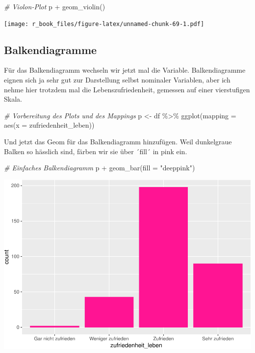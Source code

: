 \documentclass[
]{book}
\newenvironment{Shaded}{\begin{snugshade}}{\end{snugshade}}
\newcommand{\AttributeTok}[1]{\textcolor[rgb]{0.77,0.63,0.00}{#1}}
\newcommand{\CommentTok}[1]{\textcolor[rgb]{0.56,0.35,0.01}{\textit{#1}}}
\newcommand{\FunctionTok}[1]{\textcolor[rgb]{0.00,0.00,0.00}{#1}}
\newcommand{\NormalTok}[1]{#1}
\newcommand{\OtherTok}[1]{\textcolor[rgb]{0.56,0.35,0.01}{#1}}
\newcommand{\SpecialCharTok}[1]{\textcolor[rgb]{0.00,0.00,0.00}{#1}}
\newcommand{\StringTok}[1]{\textcolor[rgb]{0.31,0.60,0.02}{#1}}
\begin{document}
\begin{Shaded}
\begin{Highlighting}[]
\CommentTok{\# Violon{-}Plot}
\NormalTok{p }\SpecialCharTok{+} \FunctionTok{geom\_violin}\NormalTok{()}
\end{Highlighting}
\end{Shaded}

\texttt{[image: r\_book\_files/figure-latex/unnamed-chunk-69-1.pdf]}

\hypertarget{balkendiagramme}{%
\subsection{Balkendiagramme}\label{balkendiagramme}}

Für das Balkendiagramm wechseln wir jetzt mal die Variable. Balkendiagramme eignen sich ja sehr gut zur Darstellung selbst nominaler Variablen, aber ich nehme hier trotzdem mal die Lebenszufriedenheit, gemessen auf einer vierstufigen Skala.

\begin{Shaded}
\begin{Highlighting}[]
\CommentTok{\# Vorbereitung des Plots und des Mappings}
\NormalTok{p }\OtherTok{\textless{}{-}}\NormalTok{ df }\SpecialCharTok{\%\textgreater{}\%} 
  \FunctionTok{ggplot}\NormalTok{(}\AttributeTok{mapping =} \FunctionTok{aes}\NormalTok{(}\AttributeTok{x =}\NormalTok{ zufriedenheit\_leben))}
\end{Highlighting}
\end{Shaded}

Und jetzt das Geom für das Balkendiagramm hinzufügen. Weil dunkelgraue Balken so hässlich sind, färben wir sie über ´fill´ in pink ein.

\begin{Shaded}
\begin{Highlighting}[]
\CommentTok{\# Einfaches Balkendiagramm}
\NormalTok{p }\SpecialCharTok{+} \FunctionTok{geom\_bar}\NormalTok{(}\AttributeTok{fill =} \StringTok{"deeppink"}\NormalTok{)}
\end{Highlighting}
\end{Shaded}

\includegraphics{r_book_files/figure-latex/unnamed-chunk-72-1.pdf}
\end{document}

